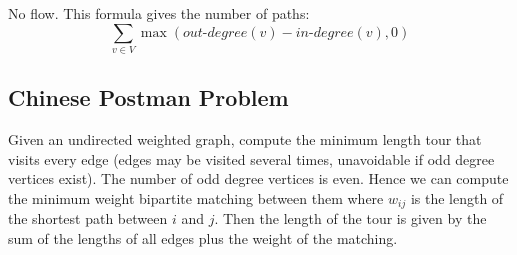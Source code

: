 No flow. This formula gives the number of paths:
$$
\sum_{v \in V} \max \left( \textit{out-degree}(v) - \textit{in-degree}(v), 0 \right)
$$



\subsection{Chinese Postman Problem}

Given an undirected weighted graph, compute the minimum length tour that visits every edge (edges may be visited several times, unavoidable if odd degree vertices exist). The number of odd degree vertices is even. Hence we can compute the minimum weight bipartite matching between them where $w_{ij}$ is the length of the shortest path between $i$ and $j$. Then the length of the tour is given by the sum of the lengths of all edges plus the weight of the matching.